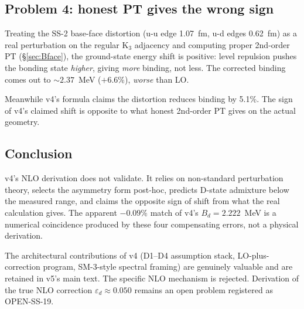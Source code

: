 \documentclass[11pt,letterpaper]{article}
\newcommand{\Bd}{B_{d}}
\newcommand{\epsd}{\varepsilon_{d}}
\begin{document}
\subsection{Problem 4: honest PT gives the wrong sign}

Treating the SS-2 base-face distortion (u-u edge 1.07~fm, u-d edges 0.62~fm) as a real perturbation on the regular K$_3$ adjacency and computing proper 2nd-order PT (§\ref{sec:Bface}), the ground-state energy shift is positive: level repulsion pushes the bonding state \emph{higher}, giving \emph{more} binding, not less. The corrected binding comes out to $\sim 2.37$~MeV ($+6.6\%$), \emph{worse} than LO.

Meanwhile v4's formula claims the distortion reduces binding by 5.1\%. The sign of v4's claimed shift is opposite to what honest 2nd-order PT gives on the actual geometry.

\subsection{Conclusion}

v4's NLO derivation does not validate. It relies on non-standard perturbation theory, selects the asymmetry form post-hoc, predicts D-state admixture below the measured range, and claims the opposite sign of shift from what the real calculation gives. The apparent $-0.09\%$ match of v4's $\Bd = 2.222$~MeV is a numerical coincidence produced by these four compensating errors, not a physical derivation.

The architectural contributions of v4 (D1--D4 assumption stack, LO-plus-correction program, SM-3-style spectral framing) are genuinely valuable and are retained in v5's main text. The specific NLO mechanism is rejected. Derivation of the true NLO correction $\epsd \approx 0.050$ remains an open problem registered as OPEN-SS-19.
\end{document}
